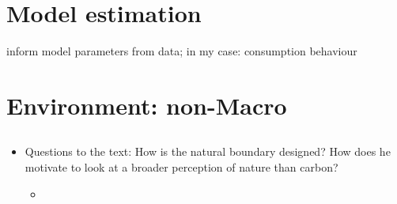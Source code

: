\documentclass[12pt]{article}
\begin{document}
\section{Model estimation}
inform model parameters from data; in my case: consumption behaviour

\section{Environment: non-Macro}
\subsection{\cite{Dasgupta2021}}
\begin{itemize}
\item Questions to the text: How is the natural boundary designed? How does he motivate to look at a broader perception of nature than carbon?
\begin{itemize}
\item
\end{itemize}
\end{itemize}
\clearpage

\end{document}
